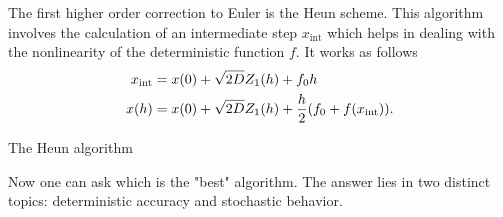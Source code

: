 \documentclass[../../master_thesis_np.tex]{subfiles}
\begin{document}
		The first higher order correction to Euler is the Heun scheme. This algorithm involves the calculation of an intermediate step $x_{\text{int}}$ which helps in dealing with the nonlinearity of the deterministic function $f$. It works as follows
		\begin{equation}
			\begin{aligned}
				x_{\text{int}} &= x(0) + \sqrt{2D} Z_1(h) + f_0 h\\
				x(h) &= x(0) + \sqrt{2D} Z_1(h) + \frac{h}{2} \qty(f_0 + f(x_{\text{int}})).
			\end{aligned}
		\end{equation}
		
		\begin{algorithm}
			\caption{The Heun algorithm} \label{alg:heun}	
			\begin{algorithmic}[1]
				\EndFor
				\EndFor
			\end{algorithmic}
		\end{algorithm}
		Now one can ask which is the "best" algorithm. The answer lies in two distinct topics: deterministic accuracy and stochastic behavior.
		
		
		
\end{document}
